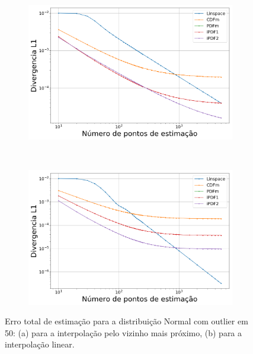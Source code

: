 \begin{figure}[H]
	\centering
	\begin{subfigure}[b]{0.45\textwidth}
		\centering 
		\includegraphics[width=\textwidth]{./figuras/ERRORPLOT_L1_TRUE_NORMAL_NEAREST_050_log}
		\caption{}
		\label{fig:error_norm_near_50}
	\end{subfigure}
	\hfill
	~ %
	\begin{subfigure}[b]{0.45\textwidth}
		\centering 
		\includegraphics[width=\textwidth]{./figuras/ERRORPLOT_L1_TRUE_NORMAL_LINEAR_050_log}
		\caption{}
		\label{fig:error_norm_lin_50}
	\end{subfigure}
\caption{Erro total de estimação para a distribuição Normal com outlier em 50: (a) para a interpolação pelo vizinho mais próximo, (b) para a interpolação linear.}
\label{fig:Error_out}
\end{figure}

